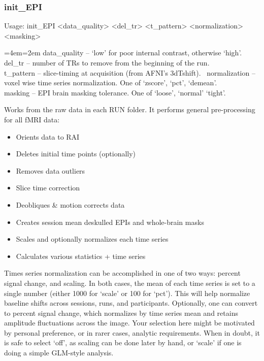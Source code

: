 \documentclass[final,titlepage,letterpaper,oneside,12pt]{article}
\renewcommand{\texttt}[2][BrickRed]{\textcolor{#1}{\ttfamily #2}}%
\newenvironment{blockquote}{%
  \par%
  \medskip
  \leftskip=4em\rightskip=2em%
  \noindent\ignorespaces}{%
  \par\medskip}
\begin{document}
\subsubsection{init\_EPI}
Usage: \texttt{init\_EPI <data\_quality> <del\_tr> <t\_pattern> <normalization> <masking>}

\begin{blockquote}
data\_quality -- `low' for poor internal contrast, otherwise `high'. \\
del\_tr -- number of TRs to remove from the beginning of the run. \\
t\_pattern -- slice-timing at acquisition (from AFNI's 3dTshift). \
normalization -- voxel wise time series normalization. One of `zscore', `pct', `demean'. \\
masking -- EPI brain masking tolerance. One of `loose', `normal' `tight'. \
\end{blockquote}

\noindent Works from the raw data in each RUN folder. It performs general pre-processing for all fMRI data:

\begin{itemize} \itemsep-2pt
    \item{Orients data to RAI}
    \item{Deletes initial time points (optionally)}
    \item{Removes data outliers}
    \item{Slice time correction}
    \item{Deobliques \& motion corrects data}
    \item{Creates session mean deskulled EPIs and whole-brain masks}
    \item{Scales and optionally normalizes each time series}
    \item{Calculates various statistics + time series}
\end{itemize}

Times series normalization can be accomplished in one of two ways: percent signal change, and scaling. In both cases, the mean of each time series is set to a single number (either 1000 for `scale' or 100 for `pct'). This will help normalize baseline shifts across sessions, runs, and participants. Optionally, one can convert to percent signal change, which normalizes by time series mean and retains amplitude fluctuations across the image. Your selection here might be motivated by personal preference, or in rarer cases, analytic requirements. When in doubt, it is safe to select `off', as scaling can be done later by hand, or `scale' if one is doing a simple GLM-style analysis.
\end{document}
